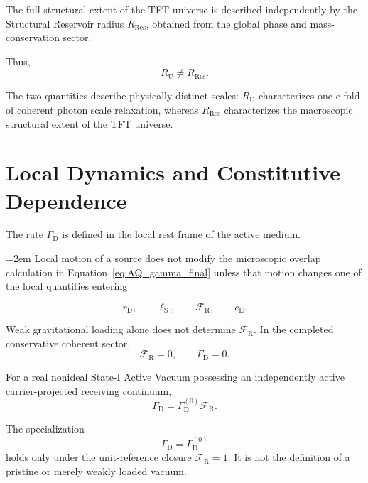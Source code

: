 The full structural extent of the TFT universe is described independently by
the Structural Reservoir radius $R_{\mathrm{Res}}$, obtained from the global
phase and mass-conservation sector.

Thus,
\begin{equation}
    \boxed{
    R_{\mathrm U}
    \neq
    R_{\mathrm{Res}}.
    }
    \label{eq:AQ_RU_not_RRes}
\end{equation}

The two quantities describe physically distinct scales:
$R_{\mathrm U}$ characterizes one e-fold of coherent photon scale relaxation,
whereas $R_{\mathrm{Res}}$ characterizes the macroscopic structural extent of
the TFT universe.


\section{Local Dynamics and Constitutive Dependence}

The rate $\Gamma_{\mathrm D}$ is defined in the local rest frame of the active
medium.

{\emergencystretch=2em
Local motion of a source does not modify the microscopic overlap calculation
in Equation~\eqref{eq:AQ_gamma_final} unless that motion changes one of the
local quantities entering\par}
\begin{equation}
    r_{\mathrm D},
    \qquad
    \ell_{\mathrm S},
    \qquad
    \mathcal F_{\mathrm R},
    \qquad
    c_{\mathrm E}.
\end{equation}

Weak gravitational loading alone does not determine
$\mathcal F_{\mathrm R}$. In the completed conservative coherent sector,
\begin{equation}
    \mathcal F_{\mathrm R}=0,
    \qquad
    \Gamma_{\mathrm D}=0.
\end{equation}

For a real nonideal State-I Active Vacuum possessing an independently active
carrier-projected receiving continuum,
\begin{equation}
    \Gamma_{\mathrm D}
    =
    \Gamma_{\mathrm D}^{(0)}
    \mathcal F_{\mathrm R}.
\end{equation}

The specialization
\begin{equation}
    \Gamma_{\mathrm D}
    =
    \Gamma_{\mathrm D}^{(0)}
\end{equation}
holds only under the unit-reference closure
$\mathcal F_{\mathrm R}=1$. It is not the definition of a pristine or merely
weakly loaded vacuum.

